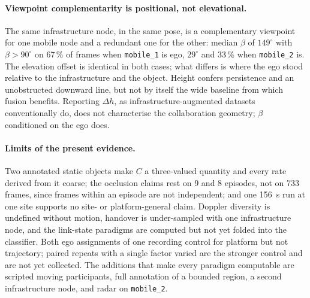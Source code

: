 \paragraph{Viewpoint complementarity is positional, not elevational.}
The same infrastructure node, in the same pose, is a complementary viewpoint
for one mobile node and a redundant one for the other: median $\beta$ of
$149^\circ$ with $\beta > 90^\circ$ on 67\,\% of frames when \texttt{mobile\_1}
is ego, $29^\circ$ and 33\,\% when \texttt{mobile\_2} is. The elevation offset
is identical in both cases; what differs is where the ego stood relative to the
infrastructure and the object. Height confers persistence and an unobstructed
downward line, but not by itself the wide baseline from which fusion benefits.
Reporting $\Delta h$, as infrastructure-augmented datasets conventionally do,
does not characterise the collaboration geometry; $\beta$ conditioned on the
ego does.

\paragraph{Limits of the present evidence.}
Two annotated static objects make $C$ a three-valued quantity and every rate
derived from it coarse; the occlusion claims rest on 9 and 8 episodes, not on
\num{733} frames, since frames within an episode are not independent; and one
\SI{156}{\second} run at one site supports no site- or platform-general claim.
Doppler diversity is undefined without motion, handover is under-sampled with
one infrastructure node, and the link-state paradigms are computed but not yet
folded into the classifier. Both ego assignments of one recording control for
platform but not trajectory; paired repeats with a single factor varied are the
stronger control and are not yet collected. The additions that make every
paradigm computable are scripted moving participants, full annotation of a
bounded region, a second infrastructure node, and radar on \texttt{mobile\_2}.
